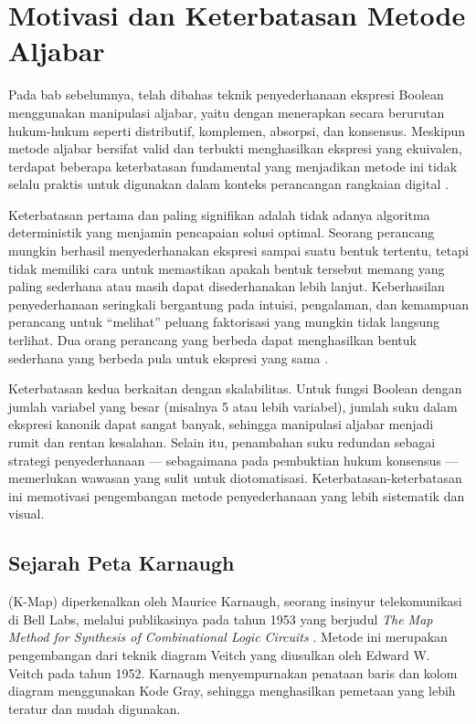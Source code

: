 \section{Motivasi dan Keterbatasan Metode Aljabar}

Pada bab sebelumnya, telah dibahas teknik penyederhanaan ekspresi Boolean menggunakan manipulasi aljabar, yaitu dengan menerapkan secara berurutan hukum-hukum seperti distributif, komplemen, absorpsi, dan konsensus. Meskipun metode aljabar bersifat valid dan terbukti menghasilkan ekspresi yang ekuivalen, terdapat beberapa keterbatasan fundamental yang menjadikan metode ini tidak selalu praktis untuk digunakan dalam konteks perancangan rangkaian digital \cite{rosen2019}.

Keterbatasan pertama dan paling signifikan adalah tidak adanya algoritma deterministik yang menjamin pencapaian solusi optimal. Seorang perancang mungkin berhasil menyederhanakan ekspresi sampai suatu bentuk tertentu, tetapi tidak memiliki cara untuk memastikan apakah bentuk tersebut memang yang paling sederhana atau masih dapat disederhanakan lebih lanjut. Keberhasilan penyederhanaan seringkali bergantung pada intuisi, pengalaman, dan kemampuan perancang untuk ``melihat'' peluang faktorisasi yang mungkin tidak langsung terlihat. Dua orang perancang yang berbeda dapat menghasilkan bentuk sederhana yang berbeda pula untuk ekspresi yang sama \cite{allaboutcircuits_boolean}.

Keterbatasan kedua berkaitan dengan skalabilitas. Untuk fungsi Boolean dengan jumlah variabel yang besar (misalnya 5 atau lebih variabel), jumlah suku dalam ekspresi kanonik dapat sangat banyak, sehingga manipulasi aljabar menjadi rumit dan rentan kesalahan. Selain itu, penambahan suku redundan sebagai strategi penyederhanaan --- sebagaimana pada pembuktian hukum konsensus --- memerlukan wawasan yang sulit untuk diotomatisasi. Keterbatasan-keterbatasan ini memotivasi pengembangan metode penyederhanaan yang lebih sistematik dan visual.

\subsection{Sejarah Peta Karnaugh}

 (K-Map) diperkenalkan oleh Maurice Karnaugh, seorang insinyur telekomunikasi di Bell Labs, melalui publikasinya pada tahun 1953 yang berjudul \textit{The Map Method for Synthesis of Combinational Logic Circuits} \cite{karnaugh1953}. Metode ini merupakan pengembangan dari teknik diagram Veitch yang diusulkan oleh Edward W. Veitch pada tahun 1952. Karnaugh menyempurnakan penataan baris dan kolom diagram menggunakan Kode Gray, sehingga menghasilkan pemetaan yang lebih teratur dan mudah digunakan.

